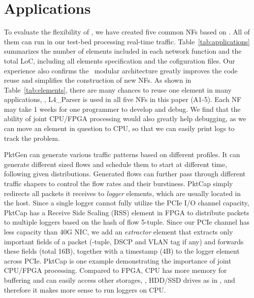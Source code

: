 \section{Applications}
\label{sec:application}

To evaluate the flexibility of \name, we have created five common NFs based on \name. 
All of them can run in our test-bed processing real-time traffic. 
%
Table~\ref{tab:applications} summarizes the number of elements included in each network function and the total LoC, including all elements specification and the cofiguration files.
%
Our experience also confirms the \name\ modular architecture greatly improves the code reuse and simplifies 
the construction of new NFs. 
As shown in Table~\ref{tab:elements}, there are many chances to reuse one element in many applications, \eg, L4\_Parser 
is used in all five NFs in this paper (A1-5).
%
Each NF may take 1 weeks for one programmer to develop and debug. 
We find that the ability of joint CPU/FPGA processing would also greatly help 
debugging, as we can move 
an element in question to CPU, so that we can easily print logs to track the problem.


 PktGen can generate various
traffic patterns based on different profiles. 
It can generate different sized flows and schedule them to start at different time, 
following given distributions. 
%
Generated flows can further pass through different traffic shapers to control the flow rates and their burstiness. 
PktCap simply redirects all packets it receives to \textit{logger} elements, which are usually located in the host.
Since a single logger cannot fully utilize the PCIe I/O channel capacity, PktCap has a Receive Side Scaling (RSS)
element in FPGA to distribute packets to multiple loggers based on the hash of flow 5-tuple.
%
Since our PCIe channel has less capacity than 40G NIC, we add an \textit{extractor} element that extracts only important
fields of a packet (-tuple, DSCP and VLAN tag if any) and forwards these fields (total 16B), together with a timestamp
 (4B) to the logger element across PCIe.
%
PktCap is one example demonstrating the importance of joint CPU/FPGA processing. 
Compared to FPGA, CPU has 
more memory for buffering and can easily access other storages, \eg, HDD/SSD drives as in \cite{lee2015flosis}, and therefore it makes more sense to run loggers on CPU.

